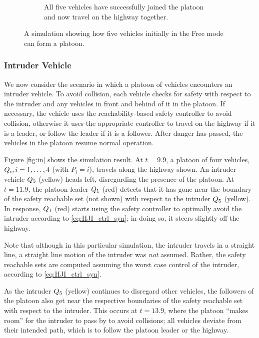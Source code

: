 \begin{figure}
\begin{subfigure}[t]{0.45\textwidth}
        \caption{All five vehicles have successfully joined the platoon and now travel on the highway together.}
    \end{subfigure}   
    \caption{A simulation showing how five vehicles initially in the Free mode can form a platoon. \label{fig:fp}}
\end{figure}


\subsubsection{Intruder Vehicle}
We now consider the scenario in which a platoon of vehicles encounters an intruder vehicle. To avoid collision, each vehicle checks for safety with respect to the intruder and any vehicles in front and behind of it in the platoon. If necessary, the vehicle uses the reachability-based safety controller to avoid collision, otherwise it uses the appropriate controller to travel on the highway if it is a leader, or follow the leader if it is a follower. After danger has passed, the vehicles in the platoon resume normal operation.

Figure \ref{fig:in} shows the simulation result. At $t=9.9$, a platoon of four vehicles, $Q_{i},i=1,\ldots,4$ (with $P_i = i$), travels along the highway shown. An intruder vehicle $Q_{5}$ (yellow) heads left, disregarding the presence of the platoon. At $t=11.9$, the platoon leader $Q_{1}$ (red) detects that it has gone near the boundary of the safety reachable set (not shown) with respect to the intruder $Q_{5}$ (yellow). In response, $Q_{1}$ (red) starts using the safety controller to optimally avoid the intruder according to \eqref{eq:HJI_ctrl_syn}; in doing so, it steers slightly off the highway. 

Note that although in this particular simulation, the intruder travels in a straight line, a straight line motion of the intruder was \textit{not} assumed. Rather, the safety reachable sets are computed assuming the worst case control of the intruder, according to \eqref{eq:HJI_ctrl_syn}.

As the intruder $Q_{5}$ (yellow) continues to disregard other vehicles, the followers of the platoon also get near the respective boundaries of the safety reachable set with respect to the intruder. This occurs at $t=13.9$, where the platoon ``makes room'' for the intruder to pass by to avoid collisions; all vehicles deviate from their intended path, which is to follow the platoon leader or the highway.

